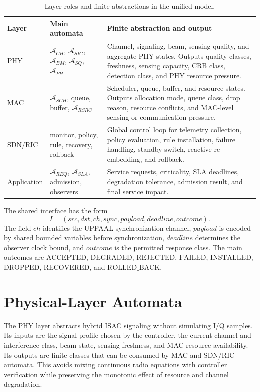 \documentclass[runningheads]{llncs}
\newcommand{\A}[1]{\mathcal{A}_{#1}}
\begin{document}
\begin{table}[t]
\caption{Layer roles and finite abstractions in the unified model.}
\label{tab:layers}
\centering
\small
\begin{tabular}{|p{}|p{}|p{}|}
\hline
\textbf{Layer} & \textbf{Main automata} & \textbf{Finite abstraction and output}\\
\hline
PHY & $\A{CH}$, $\A{SIG}$, $\A{BM}$, $\A{SQ}$, $\A{PH}$ & Channel, signaling, beam, sensing-quality, and aggregate PHY states. Outputs quality classes, freshness, sensing capacity, CRB class, detection class, and PHY resource pressure.\\
\hline
MAC & $\A{SCH}$, queue, buffer, $\A{RSRC}$ & Scheduler, queue, buffer, and resource states. Outputs allocation mode, queue class, drop reason, resource conflicts, and MAC-level sensing or communication pressure.\\
\hline
SDN/RIC & monitor, policy, rule, recovery, rollback & Global control loop for telemetry collection, policy evaluation, rule installation, failure handling, standby switch, reactive re-embedding, and rollback.\\
\hline
Application & $\A{REQ}$, $\A{SLA}$, admission, observers & Service requests, criticality, SLA deadlines, degradation tolerance, admission result, and final service impact.\\
\hline
\end{tabular}
\end{table}

The shared interface has the form
\begin{equation}
I=(src,dst,ch,sync,payload,deadline,outcome).
\end{equation}
The field $ch$ identifies the UPPAAL synchronization channel, $payload$ is encoded by shared bounded variables before synchronization, $deadline$ determines the observer clock bound, and $outcome$ is the permitted response class. The main outcomes are $\mathrm{ACCEPTED}$, $\mathrm{DEGRADED}$, $\mathrm{REJECTED}$, $\mathrm{FAILED}$, $\mathrm{INSTALLED}$, $\mathrm{DROPPED}$, $\mathrm{RECOVERED}$, and $\mathrm{ROLLED\_BACK}$.

\section{Physical-Layer Automata}

The PHY layer abstracts hybrid ISAC signaling without simulating I/Q samples. Its inputs are the signal profile chosen by the controller, the current channel and interference class, beam state, sensing freshness, and MAC resource availability. Its outputs are finite classes that can be consumed by MAC and SDN/RIC automata. This avoids mixing continuous radio equations with controller verification while preserving the monotonic effect of resource and channel degradation.
\end{document}
